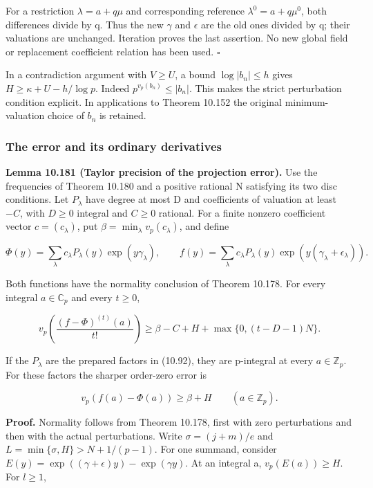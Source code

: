 \documentclass[
  11pt,
  a4paper,
]{article}
\begin{document}
For a restriction \(\lambda=a+q\mu\) and corresponding reference
\(\lambda^0=a+q\mu^0\), both differences divide by q. Thus the new
\(\gamma\) and \(\epsilon\) are the old ones divided by q; their
valuations are unchanged. Iteration proves the last assertion. No new
global field or replacement coefficient relation has been used.
\(\square\)

In a contradiction argument with \(V\ge U\), a bound \(\log|b_n|\le h\)
gives \(H\ge\kappa+U-h/\log p\). Indeed \(p^{v_p(b_n)}\le|b_n|\). This
makes the strict perturbation condition explicit. In applications to
Theorem 10.152 the original minimum-valuation choice of \(b_n\) is
retained.

\subsubsection{The error and its ordinary
derivatives}\label{the-error-and-its-ordinary-derivatives}

\textbf{Lemma 10.181 (Taylor precision of the projection error).} Use
the frequencies of Theorem 10.180 and a positive rational N satisfying
its two disc conditions. Let \(P_\lambda\) have degree at most D and
coefficients of valuation at least \(-C\), with \(D\ge0\) integral and
\(C\ge0\) rational. For a finite nonzero coefficient vector
\(c=(c_\lambda)\), put \(\beta=\min_\lambda v_p(c_\lambda)\), and define

\[
\Phi(y)=\sum_\lambda c_\lambda P_\lambda(y)
                 \exp(y\gamma_\lambda),\qquad
f(y)=\sum_\lambda c_\lambda P_\lambda(y)
                 \exp(y(\gamma_\lambda+\epsilon_\lambda)).
\tag{10.685}
\]

Both functions have the normality conclusion of Theorem 10.178. For
every integral \(a\in\mathbb C_p\) and every \(t\ge0\),

\[
v_p\left(\frac{(f-\Phi)^{(t)}(a)}{t!}\right)
\ge\beta-C+H+\max\{0,(t-D-1)N\}.
\tag{10.686}
\]

If the \(P_\lambda\) are the prepared factors in (10.92), they are
p-integral at every \(a\in\mathbb Z_p\). For these factors the sharper
order-zero error is

\[
v_p(f(a)-\Phi(a))\ge\beta+H
                       \qquad(a\in\mathbb Z_p).
\tag{10.687}
\]

\textbf{Proof.} Normality follows from Theorem 10.178, first with zero
perturbations and then with the actual perturbations. Write
\(\sigma=(j+m)/e\) and \(L=\min\{\sigma,H\}>N+1/(p-1)\). For one
summand, consider \(E(y)=\exp((\gamma+\epsilon)y)-\exp(\gamma y)\). At
an integral a, \(v_p(E(a))\ge H\). For \(l\ge1\),
\end{document}
